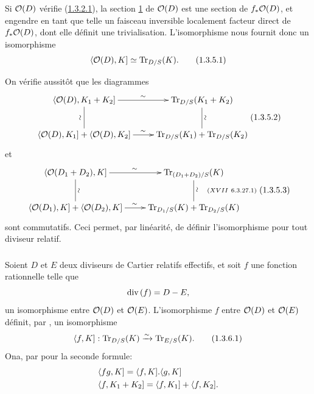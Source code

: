 \documentclass[10pt]{../fichiers-configuration-latex/smfart}
\begin{document}
Si ${\mathcal O}(D)$ vérifie (\hyperref[XVIII.par1.3.2.1]{1.3.2.1}), la section
\hyperref[XVIII.sec1]{1} de ${\mathcal O}(D)$ est une 
section de $f_{\ast}{\mathcal O}(D)$, et engendre en tant que telle un
faisceau inversible localement facteur direct de $f_{\ast}{\mathcal O}(D)$,
dont elle définit une trivialisation. L'isomorphisme  nous
fournit donc un isomorphisme 
\begin{equation*}
\langle {\mathcal O}(D),K]\simeq \operatorname{Tr}_{D/S}(K){}.\tag{1.3.5.1}
\end{equation*}

On vérifie aussitôt que les diagrammes
$$\vcenter{
\xymatrix{
  \langle \Oo(D) , K_1 + K_2] \ar[r]^{\sim} \ar@{-}[d]_{\text{\rotatebox{90}{$\sim$}}}& \Tr_{D/S}(K_1 + K_2)\ar@{-}[d]^{\text{\rotatebox{90}{$\sim$}}}\\
\langle \Oo(D),K_1] + \langle \Oo(D) ,K_2] \ar[r]^{\sim}& \Tr_{D/S}(K_1) + \Tr_{D/S}(K_2)
}}\leqno{(1.3.5.2)}
$$%
et
$$\vcenter{
\xymatrix{
\langle \Oo(D_1 + D_2),K] \ar[r]^{\sim}
\ar@{-}[d]^{\text{\rotatebox{90}{$\sim$}}}& \Tr_{(D_1 +
  D_{2})/S}(K)\ar@{-}[d]^{\text{\rotatebox{90}{$\sim$}}\quad (XVII\
  6.3.27.1)}\\ 
\langle \Oo(D_1),K] + \langle \Oo(D_2),K] \ar[r]^{\sim}& \Tr_{D_1 /S}(K) +
    \Tr_{D_{2} /S} (K)
}}\leqno{(1.3.5.3)}
$$%
sont commutatifs. Ceci permet, par linéarité, de définir
l'isomorphisme  pour tout diviseur relatif.

\subsubsection{}
Soient $D$ et $E$ deux diviseurs de Cartier relatifs effectifs, et soit
$f$ une fonction rationnelle telle que
$$
\text{\rm div\,}(f)=D-E{},
$$
\ie un isomorphisme entre ${\mathcal O}(D)$ et ${\mathcal O}(E)$. L'isomorphisme $f$
entre ${\mathcal O}(D)$ et ${\mathcal O}(E)$ définit, par , un isomorphisme
\begin{equation*}
\langle f,K]:\operatorname{Tr}_{D/S}(K)\xrightarrow{\sim} \operatorname{Tr}_{E/S}(K){}.\tag{1.3.6.1}
\end{equation*}\etiquette[1.3.6.1]{XVIII.eq1.3.6.1}%
On\pageoriginale a, par  pour la seconde formule: 
\begin{align*}
& \langle fg,K]=\langle f,K].\langle g,K]\\
& \langle f,K_{1}+K_{2}]=\langle f,K_{1}]+\langle f,K_{2}]{}.
\end{align*}
\end{document}
